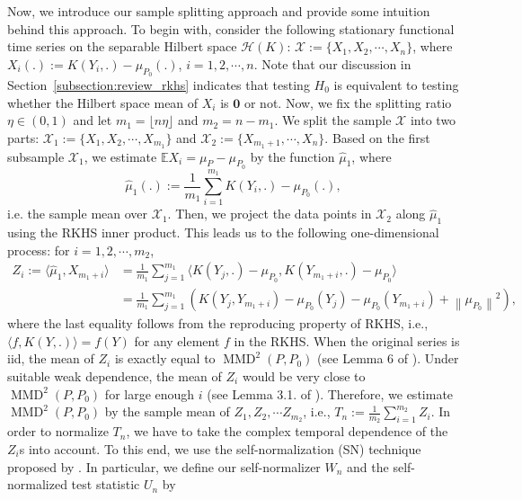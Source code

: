 \documentclass[11pt]{article}
\newcommand{\bE}{\mathbb{E}}
\theoremstyle{plain}
\theoremstyle{definition}
\theoremstyle{remark}
\begin{document}
Now, we introduce our sample splitting approach and provide some intuition behind this approach. To begin with, consider the following stationary functional time series on the separable Hilbert space $\mathcal{H}(K)$: $\mathcal{X}:=\{X_1,X_2,\cdots,X_n\}$, where $X_i(.):=K(Y_i,.)-\mu_{P_0}(.)$, $i=1,2,\cdots,n.$ Note that our discussion in Section~\ref{subsection:review_rkhs} indicates that testing  $H_0$ is equivalent to testing whether the Hilbert space mean of $X_i$ is $\mathbf{0}$ or not. Now, we fix the splitting ratio $\eta\in (0,1)$ and let $m_1=\lfloor n \eta \rfloor$ and $m_2=n-m_1$. We split the sample $\mathcal{X}$ into two parts: $\mathcal{X}_1:=\{X_1,X_2,\cdots,X_{m_1}\}$ and $\mathcal{X}_2:=\{X_{m_1+1},\cdots,X_{n}\}$. Based on the first subsample $\mathcal{X}_1$, we estimate $\bE X_i=\mu_P-\mu_{P_0}$ by the function $\hat{\mu}_1$, where \
\begin{equation}\label{eqn:mu_1_hat_GOF}
   \hat{\mu}_1(.):=\frac{1}{m_1}\sum_{i=1}^{m_1} K(Y_i,.)-\mu_{P_0}(.), 
\end{equation}
 i.e. the sample mean over $\mathcal{X}_1$. Then, we project the data points in $\mathcal{X}_2$ along $\hat{\mu}_1$ using the RKHS inner product. This leads us to the following one-dimensional process: for $i=1,2,\cdots,m_2$, 
\begin{align*}%
    Z_i:=\langle \hat{\mu}_1, X_{m_1+i}\rangle&=\frac{1}{m_1}\sum_{j=1}^{m_1}\langle K(Y_j,.)-\mu_{P_0},K(Y_{m_1+i},.)-\mu_{P_0}\rangle\\
    &=\frac{1}{m_1}\sum_{j=1}^{m_1} \left(K(Y_j,Y_{m_1+i})-\mu_{P_0}(Y_j)-\mu_{P_0}(Y_{m_1+i})+\left\|\mu_{P_0}\right\|^2\right),
\end{align*}
where the last equality follows from the reproducing property of RKHS, i.e., $\langle f, K(Y,.)\rangle=f(Y)$ for any element $f$ in the RKHS. When the original series is iid, the mean of $Z_i$ is exactly equal to $\operatorname{MMD}^2(P,P_0)$ (see Lemma 6 of \cite{JMLR:v13:gretton12a}). Under suitable weak dependence, the mean of $Z_i$ would be very close to $\operatorname{MMD}^2(P,P_0)$ for large enough $i$ (see Lemma 3.1. of \cite{dehling1983limit}). Therefore, we estimate $\operatorname{MMD}^2(P,P_0)$ by the sample mean of $Z_1,Z_2,\cdots Z_{m_2}$, i.e., $T_n:=\frac{1}{m_2}\sum_{i=1}^{m_2}Z_i.$ In order to normalize $T_n$, we have to take the complex temporal dependence of the $Z_i$s into account. To this end,  we use the self-normalization (SN) technique proposed by \cite{shao2010self}. In particular, we define our self-normalizer $W_n$ and the self-normalized test statistic $U_n$ by
\end{document}
